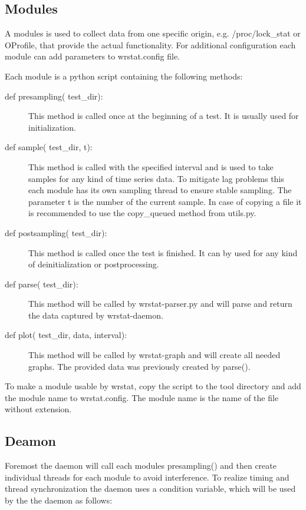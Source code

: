 \subsection{Modules}
    A modules is used to collect data from one specific origin,
	e.g. /proc/lock\_stat
	or OProfile, that provide the actual functionality.
    For additional configuration each module can add parameters to wrstat.config
    file.

	Each module is a python script containing the following methods:
    \begin{description}
        \item[def presampling( test\_dir):]
			This method is called once at the beginning of a test.
			It is usually used for initialization.

        \item[def sample( test\_dir, t):]
			This method is called with the specified interval
			and is used to take samples for any kind of time series
			data. To mitigate lag problems this each module has its own sampling thread
			to ensure stable sampling.
            The parameter t is the number of the current sample.
            In case of copying a file it is recommended to use the copy\_queued method
            from utils.py.

        \item[def postsampling( test\_dir):]
			This method is called once the test is finished.
			It can by used for any kind	
			of deinitialization or postprocessing.

        \item[def parse( test\_dir):]
			This method will be called by wrstat-parser.py
			and will parse and return the data captured by wrstat-daemon.
			
        \item[def plot( test\_dir, data, interval):]
			This method will be called by wrstat-graph and will create
			all needed graphs.
            The provided data was previously created by parse().
    \end{description}

	To make a module usable by wrstat, copy the script to the tool directory and
	add the module name to wrstat.config.
    The module name is the name of the file without extension.

\subsection{Deamon}
    Foremost the daemon will call each modules presampling() and then
    create individual threads for each module to avoid interference.
    To realize timing and thread synchronization the daemon uses a condition variable,
    which will be used by the the daemon as follows:

